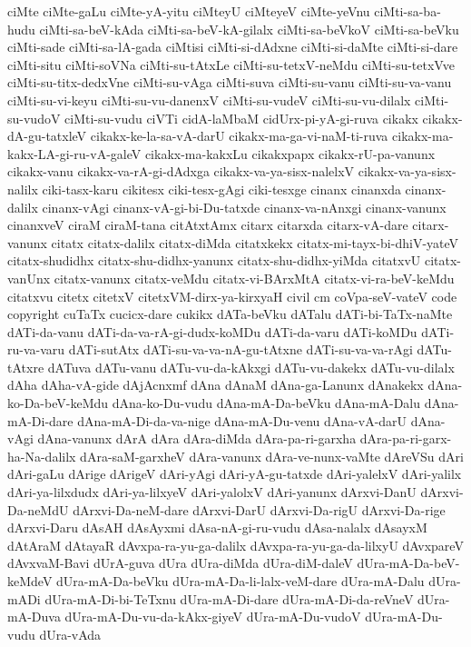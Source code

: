 {ciMte
ciMte-gaLu
ciMte-yA-yitu
ciMteyU
ciMteyeV
ciMte-yeVnu
ciMti-sa-ba-hudu
ciMti-sa-beV-kAda
ciMti-sa-beV-kA-gilalx
ciMti-sa-beVkoV
ciMti-sa-beVku
ciMti-sade
ciMti-sa-lA-gada
ciMtisi
ciMti-si-dAdxne
ciMti-si-daMte
ciMti-si-dare
ciMti-situ
ciMti-soVNa
ciMti-su-tAtxLe
ciMti-su-tetxV-neMdu
ciMti-su-tetxVve
ciMti-su-titx-dedxVne
ciMti-su-vAga
ciMti-suva
ciMti-su-vanu
ciMti-su-va-vanu
ciMti-su-vi-keyu
ciMti-su-vu-danenxV
ciMti-su-vudeV
ciMti-su-vu-dilalx
ciMti-su-vudoV
ciMti-su-vudu
ciVTi
cidA-laMbaM
cidUrx-pi-yA-gi-ruva
cikakx
cikakx-dA-gu-tatxleV
cikakx-ke-la-sa-vA-darU
cikakx-ma-ga-vi-naM-ti-ruva
cikakx-ma-kakx-LA-gi-ru-vA-galeV
cikakx-ma-kakxLu
cikakxpapx
cikakx-rU-pa-vanunx
cikakx-vanu
cikakx-va-rA-gi-dAdxga
cikakx-va-ya-sisx-nalelxV
cikakx-va-ya-sisx-nalilx
ciki-tasx-karu
cikitesx
ciki-tesx-gAgi
ciki-tesxge
cinanx
cinanxda
cinanx-dalilx
cinanx-vAgi
cinanx-vA-gi-bi-Du-tatxde
cinanx-va-nAnxgi
cinanx-vanunx
cinanxveV
ciraM
ciraM-tana
citAtxtAmx
citarx
citarxda
citarx-vA-dare
citarx-vanunx
citatx
citatx-dalilx
citatx-diMda
citatxkekx
citatx-mi-tayx-bi-dhiV-yateV
citatx-shudidhx
citatx-shu-didhx-yanunx
citatx-shu-didhx-yiMda
citatxvU
citatx-vanUnx
citatx-vanunx
citatx-veMdu
citatx-vi-BArxMtA
citatx-vi-ra-beV-keMdu
citatxvu
citetx
citetxV
citetxVM-dirx-ya-kirxyaH
civil
cm
coVpa-seV-vateV
code
copyright
cuTaTx
cucicx-dare
cukikx
dATa-beVku
dATalu
dATi-bi-TaTx-naMte
dATi-da-vanu
dATi-da-va-rA-gi-dudx-koMDu
dATi-da-varu
dATi-koMDu
dATi-ru-va-varu
dATi-sutAtx
dATi-su-va-va-nA-gu-tAtxne
dATi-su-va-va-rAgi
dATu-tAtxre
dATuva
dATu-vanu
dATu-vu-da-kAkxgi
dATu-vu-dakekx
dATu-vu-dilalx
dAha
dAha-vA-gide
dAjAcnxmf
dAna
dAnaM
dAna-ga-Lanunx
dAnakekx
dAna-ko-Da-beV-keMdu
dAna-ko-Du-vudu
dAna-mA-Da-beVku
dAna-mA-Dalu
dAna-mA-Di-dare
dAna-mA-Di-da-va-nige
dAna-mA-Du-venu
dAna-vA-darU
dAna-vAgi
dAna-vanunx
dArA
dAra
dAra-diMda
dAra-pa-ri-garxha
dAra-pa-ri-garx-ha-Na-dalilx
dAra-saM-garxheV
dAra-vanunx
dAra-ve-nunx-vaMte
dAreVSu
dAri
dAri-gaLu
dArige
dArigeV
dAri-yAgi
dAri-yA-gu-tatxde
dAri-yalelxV
dAri-yalilx
dAri-ya-lilxdudx
dAri-ya-lilxyeV
dAri-yalolxV
dAri-yanunx
dArxvi-DanU
dArxvi-Da-neMdU
dArxvi-Da-neM-dare
dArxvi-DarU
dArxvi-Da-rigU
dArxvi-Da-rige
dArxvi-Daru
dAsAH
dAsAyxmi
dAsa-nA-gi-ru-vudu
dAsa-nalalx
dAsayxM
dAtAraM
dAtayaR
dAvxpa-ra-yu-ga-dalilx
dAvxpa-ra-yu-ga-da-lilxyU
dAvxpareV
dAvxvaM-Bavi
dUrA-guva
dUra
dUra-diMda
dUra-diM-daleV
dUra-mA-Da-beV-keMdeV
dUra-mA-Da-beVku
dUra-mA-Da-li-lalx-veM-dare
dUra-mA-Dalu
dUra-mADi
dUra-mA-Di-bi-TeTxnu
dUra-mA-Di-dare
dUra-mA-Di-da-reVneV
dUra-mA-Duva
dUra-mA-Du-vu-da-kAkx-giyeV
dUra-mA-Du-vudoV
dUra-mA-Du-vudu
dUra-vAda
}
